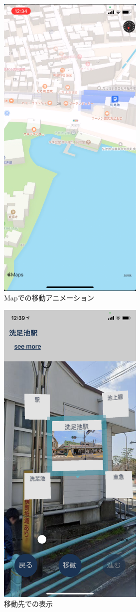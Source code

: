 \begin{figure}[htbp]
\begin{minipage}{0.5\hsize}
    \centering
    \includegraphics[width=70mm]{images/hypar_touch_move_map.png}
    \caption{Mapでの移動アニメーション} \label{fig:hypar_touch_move_map}
  \end{minipage}
\end{figure}

\begin{figure}[htbp]
  \centering
  \includegraphics[width=70mm]{images/hypar_touch_moved.png}
  \caption{移動先での表示} \label{fig:hypar_touch_moved}
\end{figure}

